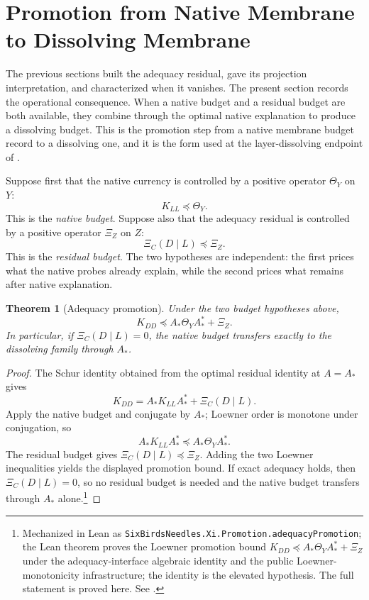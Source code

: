 \documentclass[11pt]{article}
\newcommand{\preceqq}{\preceq}
\newtheorem{theorem}{Theorem}[section]
\theoremstyle{definition}
\begin{document}
 \section{Promotion from Native Membrane to Dissolving Membrane}
\label{sec:promotion}

The previous sections built the adequacy residual, gave its projection
interpretation, and characterized when it vanishes.  The present section records
the operational consequence.  When a native budget and a residual budget are
both available, they combine through the optimal native explanation to produce
a dissolving budget.  This is the promotion step from a native membrane budget
record to a dissolving one, and it is the form used at the layer-dissolving
endpoint of \citet{Tsiokos2026NeedleKiller}.

Suppose first that the native currency is controlled by a positive operator
\(\Theta_Y\) on \(Y\):
\[
  K_{LL}\preceqq \Theta_Y.
\]
This is the \emph{native budget}.  Suppose also that the adequacy residual is
controlled by a positive operator \(\Xi_Z\) on \(Z\):
\[
  \Xi_C(D\mid L)\preceqq \Xi_Z.
\]
This is the \emph{residual budget}.  The two hypotheses are independent: the
first prices what the native probes already explain, while the second prices
what remains after native explanation.

\begin{theorem}[Adequacy promotion]\label{thm:xi:adequacy-promotion}
Under the two budget hypotheses above,
\[
  \boxed{K_{DD}\preceqq A_*\Theta_YA_*^*+\Xi_Z.}
\]
In particular, if \(\Xi_C(D\mid L)=0\), the native budget transfers exactly to
the dissolving family through \(A_*\).
\end{theorem}

\begin{proof}
The Schur identity obtained from the optimal residual identity at
\(A=A_*\) gives
\[
  K_{DD}=A_*K_{LL}A_*^*+\Xi_C(D\mid L).
\]
Apply the native budget and conjugate by \(A_*\); Loewner order is monotone
under conjugation, so
\[
  A_*K_{LL}A_*^*\preceqq A_*\Theta_YA_*^*.
\]
The residual budget gives \(\Xi_C(D\mid L)\preceqq\Xi_Z\).  Adding the two
Loewner inequalities yields the displayed promotion bound.  If exact adequacy
holds, then \(\Xi_C(D\mid L)=0\), so no residual budget is needed and the
native budget transfers through \(A_*\) alone.\footnote{Mechanized in Lean as \texttt{SixBirdsNeedles.Xi.Promotion.adequacyPromotion}; the Lean theorem proves the Loewner promotion bound \(K_{DD}\preceqq A_*\Theta_Y A_*^*+\Xi_Z\) under the adequacy-interface algebraic identity and the public Loewner-monotonicity infrastructure; the identity is the elevated hypothesis.  The full statement is proved here.  See .}
\end{proof}
\end{document}
